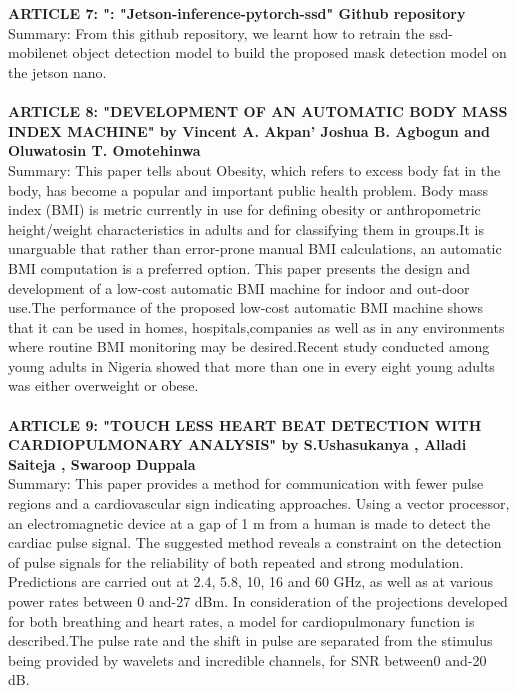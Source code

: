  \\ \\
\textbf{ARTICLE 7: ": "Jetson-inference-pytorch-ssd" Github repository
}\\
Summary:
From this github repository, we learnt how to retrain the ssd-mobilenet object detection model to build the proposed mask detection model on the jetson nano.
\\ \\
\textbf{ARTICLE 8: "DEVELOPMENT OF AN AUTOMATIC BODY MASS INDEX MACHINE" by Vincent A. Akpan' Joshua B. Agbogun and Oluwatosin T. Omotehinwa
}\\
Summary:
This paper tells about Obesity, which refers to excess body fat in the body, has become a popular and important public health problem. Body mass index 
(BMI) is metric currently in use for defining obesity or anthropometric height/weight characteristics in adults and for classifying them in groups.It is unarguable that rather than error-prone manual BMI calculations, an automatic BMI computation is a preferred option. This paper presents the design and development of a low-cost automatic BMI machine for indoor and out-door use.The performance of the proposed low-cost automatic BMI machine shows that it can be used in homes, hospitals,companies as well as in any environments where routine BMI monitoring may be desired.Recent study conducted among young adults in Nigeria showed that more than one in every 
eight young adults was either overweight or obese.
\\ \\
\textbf{ARTICLE 9: "TOUCH LESS HEART BEAT DETECTION WITH CARDIOPULMONARY ANALYSIS" by S.Ushasukanya
, Alladi Saiteja
, Swaroop Duppala
}\\
Summary:
This paper provides a method for communication with fewer pulse regions and a cardiovascular sign
indicating approaches. Using a vector processor, an electromagnetic device at a gap of 1 m from a
human is made to detect the cardiac pulse signal. The suggested method reveals a constraint on the
detection of pulse signals for the reliability of both repeated and strong modulation. Predictions are
carried out at 2.4, 5.8, 10, 16 and 60 GHz, as well as at various power rates between 0 and-27 dBm. In
consideration of the projections developed for both breathing and heart rates, a model for
cardiopulmonary function is described.The pulse rate and the shift in pulse are separated from the
stimulus being provided by wavelets and incredible channels, for SNR between0 and-20 dB.

